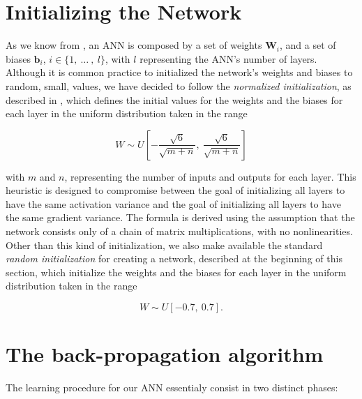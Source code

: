 	\section{Initializing the Network} %
	\label{sec:initializing_the_network}
		As we know from \cite{Goodfellow-et-al-2016,haykin2009neural,mitchell1997machine}, an ANN is composed by
		a set of weights $\mathbf{W}_{i}$, and a set of biases $\mathbf{b}_{i}$,
		$i \in \{ 1, \ \ldots \ , \ l \}$, with $l$ representing the ANN's number of layers. Although it is common
		practice to initialized the network's weights and biases to random, small, values, we have decided to
		follow the \textit{normalized initialization}, as described in
		\cite{Glorot10understandingthe,Goodfellow-et-al-2016}, which defines the initial values for the weights
		and the biases for each layer in the uniform distribution taken in the range

		\begin{equation*}
		    W \sim U \left [ -\frac{\sqrt{6}}{\sqrt{m + n}}, \ \frac{\sqrt{6}}{\sqrt{m + n}} \right ]
		\end{equation*}

		with $m$ and $n$, representing the number of inputs and outputs for each layer. This heuristic is
		designed to compromise between the goal of initializing all layers to have the same activation variance
		and the goal of initializing all layers to have the same gradient variance. The formula is derived using
		the assumption that the network consists only of a chain of matrix multiplications, with no
		nonlinearities. Other than this kind of initialization, we also make available the standard
		\textit{random initialization} for creating a network, described at the beginning of this section, which
		initialize the weights and the biases for each layer in the uniform distribution taken in the range

		\begin{equation*}
		    W \sim U \left [ - 0.7, \ 0.7 \right ].
		\end{equation*}

	\section{The back-propagation algorithm} %
	\label{sec:the_back-propagation_algorithm}
		The learning procedure for our ANN essentialy consist in two distinct phases:

